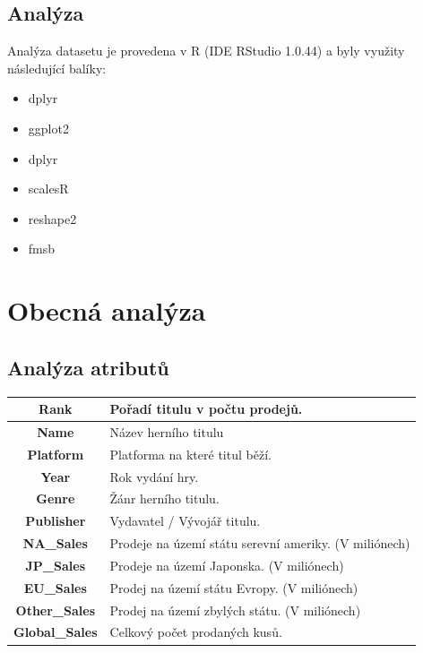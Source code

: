 \documentclass[a4paper,11pt]{article}
\begin{document}
\subsection{Analýza}
Analýza datasetu je provedena v R (IDE RStudio 1.0.44) a byly využity následující balíky:

\begin{itemize}
\item dplyr

\item ggplot2

\item dplyr

\item scalesR

\item reshape2

\item fmsb
\end{itemize}

\newpage

\section{Obecná analýza}


\subsection{Analýza atributů}

\begin{tabular}{|c|l|}
\hline
\textbf{Rank} & Pořadí titulu v počtu prodejů. \\ \hline
\textbf{Name} & Název herního titulu \\ \hline
\textbf{Platform} & Platforma na které titul běží. \\ \hline
\textbf{Year} & Rok vydání hry. \\ \hline
\textbf{Genre} & Žánr herního titulu. \\ \hline
\textbf{Publisher} & Vydavatel / Vývojář titulu. \\ \hline
\textbf{NA\_Sales} & Prodeje na území státu serevní ameriky. (V miliónech) \\ \hline
\textbf{JP\_Sales} & Prodeje na území Japonska. (V miliónech) \\ \hline
\textbf{EU\_Sales} & Prodej na území státu Evropy. (V miliónech) \\ \hline
\textbf{Other\_Sales} & Prodej na území zbylých státu. (V miliónech) \\ \hline
\textbf{Global\_Sales} & Celkový počet prodaných kusů. \\ \hline
\end{tabular}
\end{document}
